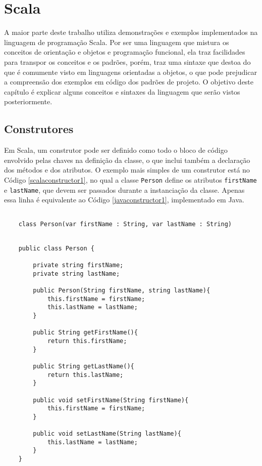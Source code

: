 \chapter{Scala}

A maior parte deste trabalho utiliza demonstrações 
e exemplos implementados na linguagem de programação Scala. 
Por ser uma linguagem que mistura os conceitos de 
orientação e objetos e programação funcional, ela traz 
facilidades para transpor os conceitos e os padrões, porém, 
traz uma sintaxe que destoa do que é comumente visto 
em linguagens orientadas a objetos, o que pode prejudicar 
a compreensão dos exemplos em código dos padrões de projeto. 
O objetivo deste capítulo é explicar alguns conceitos e 
sintaxes da linguagem que serão vistos posteriormente.


\section{Construtores}

Em Scala, um construtor pode ser definido como todo o 
bloco de código envolvido pelas chaves na definição da 
classe, o que inclui também a declaração dos métodos 
e dos atributos\cite{wampler2021}. O exemplo mais 
simples de um construtor 
está no Código \ref{scalaconstructor1}, no qual a classe 
\texttt{Person} define os atributos \texttt{firstName} e 
\texttt{lastName}, que 
devem ser passados durante a instanciação da classe. 
Apenas essa linha é equivalente ao Código \ref{javaconstructor1}, 
implementado em Java.

\begin{lstlisting}[caption={Construtor Simples em Scala.},label=scalaconstructor1]

    class Person(var firstName : String, var lastName : String)

\end{lstlisting}

\begin{lstlisting}[caption={Construtor Simples em Java.},label=javaconstructor1]

    public class Person {
        
        private string firstName;
        private string lastName;
        
        public Person(String firstName, string lastName){
            this.firstName = firstName;
            this.lastName = lastName;
        }
        
        public String getFirstName(){
            return this.firstName;
        }
        
        public String getLastName(){
            return this.lastName;
        }
        
        public void setFirstName(String firstName){
            this.firstName = firstName;
        }
        
        public void setLastName(String lastName){
            this.lastName = lastName;
        }
    }

\end{lstlisting}

